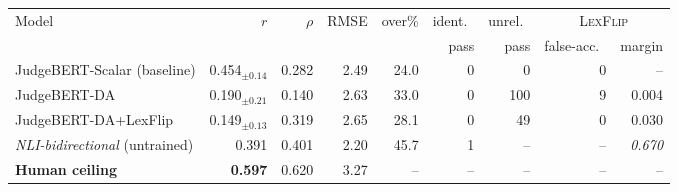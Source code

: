 \setlength{\tabcolsep}{4pt}
\begin{tabular}{lrrrrrrrr}
\toprule
Model & $r$ & $\rho$ & RMSE & over\% & ident.\ & unrel.\ & \multicolumn{2}{c}{\textsc{LexFlip}} \\
\cmidrule(lr){8-9}
 &  &  &  &  & pass & pass & false-acc.\ & margin \\
\midrule
JudgeBERT-Scalar (baseline) & 0.454$_{\pm0.14}$ & 0.282 & 2.49 & 24.0 & 0 & 0 & 0 & -- \\
\midrule
JudgeBERT-DA & 0.190$_{\pm0.21}$ & 0.140 & 2.63 & 33.0 & 0 & 100 & 9 & 0.004 \\
JudgeBERT-DA+LexFlip & 0.149$_{\pm0.13}$ & 0.319 & 2.65 & 28.1 & 0 & 49 & 0 & 0.030 \\
\midrule
\emph{NLI-bidirectional} (untrained) & 0.391 & 0.401 & 2.20 & 45.7 & 1 & -- & -- & \emph{0.670} \\
\textbf{Human ceiling} & \textbf{0.597} & 0.620 & 3.27 & -- & -- & -- & -- & -- \\
\bottomrule
\end{tabular}
